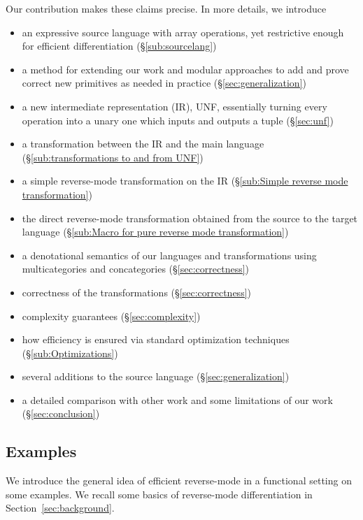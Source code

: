 Our contribution makes these claims precise. In more details, we introduce
\begin{itemize}
    \item an expressive source language with array operations, yet restrictive enough for efficient differentiation (\S\ref{sub:sourcelang})
    \item a method for extending our work and modular approaches to add and prove correct new primitives as needed in practice (\S\ref{sec:generalization})
    \item a new intermediate representation (IR), UNF, essentially turning every operation into a unary one which inputs and outputs a tuple (\S\ref{sec:unf})
    \item a transformation between the IR and the main language (\S\ref{sub:transformations to and from UNF})
    \item a simple reverse-mode transformation on the IR (\S\ref{sub:Simple reverse mode transformation})
    \item the direct reverse-mode transformation obtained from the source to the target language (\S\ref{sub:Macro for pure reverse mode transformation})
    \item a denotational semantics of our languages and transformations using multicategories and concategories (\S\ref{sec:correctness})
    \item correctness of the transformations (\S\ref{sec:correctness})
    \item complexity guarantees (\S\ref{sec:complexity})
    \item how efficiency is ensured via standard optimization techniques (\S\ref{sub:Optimizations})
    \item several additions to the source language (\S\ref{sec:generalization}) 
    \item a detailed comparison with other work and some limitations of our work (\S\ref{sec:conclusion}) 
\end{itemize}

\subsection{Examples}

We introduce the general idea of efficient reverse-mode in a functional setting on some examples.
We recall some basics of reverse-mode differentiation in Section~\ref{sec:background}.

